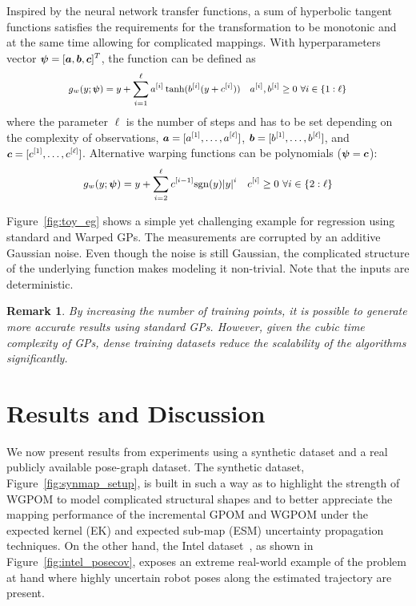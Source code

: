 \documentclass[letterpaper, 10 pt, journal, twoside]{IEEEtran}  %
\newtheorem{remark}{Remark}
\newtheorem{example}{Example}
\begin{document}
Inspired by the neural network transfer functions, a sum of hyperbolic tangent functions satisfies the requirements for the transformation to be monotonic and at the same time allowing for complicated mappings. With hyperparameters vector $\small{\boldsymbol\psi = [\boldsymbol a, \boldsymbol b, \boldsymbol c]^T}$, the function can be defined as
\begin{equation}
\footnotesize
 \label{eq:warpfun}
 g_w(y; \boldsymbol\psi) = y + \sum_{i=1}^{\ell} a^{[i]} \tanh (b^{[i]}(y + c^{[i]})) \quad a^{[i]}, b^{[i]} \geq 0 \ \forall i \in \{1:\ell\}
\end{equation}
where the parameter $\ell$ is the number of steps and has to be set depending on the complexity of observations, \mbox{$\small{\boldsymbol a = [a^{[1]},\dots,a^{[\ell]}]}$}, $\small{\boldsymbol b = [b^{[1]},\dots,b^{[\ell]}]}$, and $\small{\boldsymbol c = [c^{[1]},\dots,c^{[\ell]}]}$. Alternative warping functions can be polynomials ($\small{\boldsymbol\psi = \boldsymbol c}$):
\begin{equation}
\small
 \label{eq:warppoly}
 g_w(y; \boldsymbol\psi) = y + \sum_{i=2}^{\ell} c^{[i-1]} \mathrm{sgn}(y) \lvert y \rvert^i  \quad c^{[i]} \geq 0 \ \forall i  \in \{2:\ell\}
\end{equation}

 Figure~\ref{fig:toy_eg} shows a simple yet challenging example for regression using standard and Warped GPs. The measurements are corrupted by an additive Gaussian noise. Even though the noise is still Gaussian, the complicated structure of the underlying function makes modeling it non-trivial. Note that the inputs are deterministic.
\begin{remark}
 By increasing the number of training points, it is possible to generate more accurate results using standard GPs. However, given the cubic time complexity of GPs, dense training datasets reduce the scalability of the algorithms significantly.
\end{remark}

\section{Results and Discussion}
\label{sec:wgpomres}
We now present results from experiments using a synthetic dataset and a real publicly available pose-graph dataset. The synthetic dataset, Figure~\ref{fig:synmap_setup}, is built in such a way as to highlight the strength of WGPOM to model complicated structural shapes and to better appreciate the mapping performance of the incremental GPOM and WGPOM under the expected kernel (EK) and expected sub-map (ESM) uncertainty propagation techniques. On the other hand, the Intel dataset~\cite{Radish_data_set}, as shown in Figure~\ref{fig:intel_posecov}, exposes an extreme real-world example of the problem at hand where highly uncertain robot poses along the estimated trajectory are present. 
\end{document}

